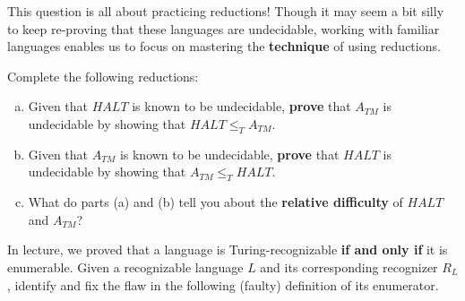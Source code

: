 \documentclass[12pt]{article}
\newenvironment{exercise}[2][Exercise]{\begin{trivlist}
\item[\hskip \labelsep {\bfseries #1}\hskip \labelsep {\bfseries #2.}]}{\end{trivlist}}
\begin{document}
 


\newcommand{\studentName}{YOUR NAME HERE} %

\newcommand{\collaborators}{
	with \textit{COLLABORATORS' NAMES HERE}
}


\begin{tip}
This question is all about practicing reductions! Though it may seem a bit silly to keep re-proving that these languages are undecidable, working with familiar languages enables us to focus on mastering the \textbf{technique} of using reductions.
\end{tip}

\begin{exercise}{1}
Complete the following reductions:

\begin{enumerate}[(a)]
    \item Given that $HALT$ is known to be undecidable, \textbf{prove} that $A_{TM}$ is undecidable by showing that $HALT \leq_T A_{TM}$.
    \item Given that $A_{TM}$ is known to be undecidable, \textbf{prove} that $HALT$ is undecidable by showing that $A_{TM} \leq_T HALT$.
    \item What do parts (a) and (b) tell you about the \textbf{relative difficulty} of $HALT$ and $A_{TM}$?

\end{enumerate}

\end{exercise}

\newpage


\begin{exercise}{2}
In lecture, we proved that a language is Turing-recognizable \textbf{if and only if} it is enumerable. Given a recognizable language $L$ and its corresponding recognizer $R_L$, identify and fix the flaw in the following (faulty) definition of its enumerator.

\noindent{}
\end{exercise}
\end{document}
